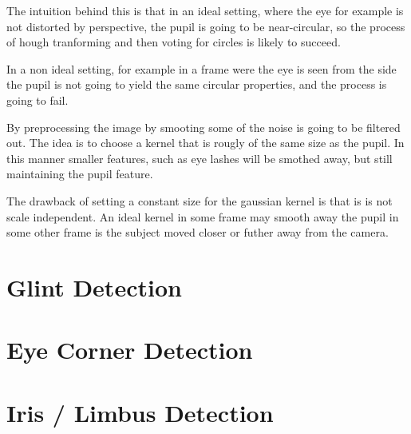 \documentclass[a4paper,11pt]{article}
\begin{document}
The intuition behind this is that in an ideal setting, where the eye for example is not distorted by perspective, the pupil is going to be near-circular, so the process of hough tranforming and then voting for circles is likely to succeed.

In a non ideal setting, for example in a frame were the eye is seen from the side the pupil is not going to yield the same circular properties, and the process is going to fail.

By preprocessing the image by smooting some of the noise is going to be filtered out. The idea is to choose a kernel that is rougly of the same size as the pupil. In this manner smaller features, such as eye lashes will be smothed away, but still maintaining the pupil feature.

The drawback of setting a constant size for the gaussian kernel is that is is not scale independent. An ideal kernel in some frame may smooth away the pupil in some other frame is the subject moved closer or futher away from the camera.











\section{Glint Detection}



\section{Eye Corner Detection}


\section{Iris / Limbus Detection}
\end{document}
